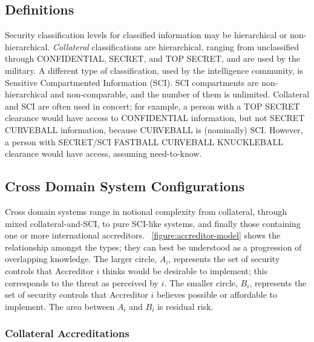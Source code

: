 \documentclass[10pt,letterpaper,conference]{IEEEtran}
\begin{document}
\subsection{Definitions}

Security classification levels for classified information may be hierarchical or non-hierarchical.
\emph{Collateral} classifications are hierarchical, ranging from unclassified through CONFIDENTIAL,
SECRET, and TOP SECRET, and are used by the military. A different type of classification, used by
the intelligence community, is Sensitive Compartmented Information (SCI). SCI compartments are
non-hierarchical and non-comparable, and the number of them is unlimited. Collateral and SCI are
often used in concert; for example, a person with a TOP SECRET clearance would have access to
CONFIDENTIAL information, but not SECRET CURVEBALL information, because CURVEBALL is (nominally)
SCI. However, a person with SECRET/SCI FASTBALL CURVEBALL KNUCKLEBALL clearance would have access,
assuming need-to-know.

\subsection{Cross Domain System Configurations}

Cross domain systems range in notional complexity from collateral, through mixed collateral-and-SCI,
to pure SCI-like systems, and finally those containing one or more international accreditors.
\figurename~\ref{figure:accreditor-model} shows the relationship amongst the types; they can best
be understood as a progression of overlapping knowledge. The larger circle, $A_i$, represents
the set of security controls that Accreditor $i$ thinks would be desirable to implement; this
corresponds to the threat as perceived by $i$. The smaller circle, $B_i$, represents the set of
security controls that Accreditor $i$ believes possible or affordable to implement. The area
between $A_i$ and $B_i$ is residual risk.

\subsubsection{Collateral Accreditations}
\end{document}
